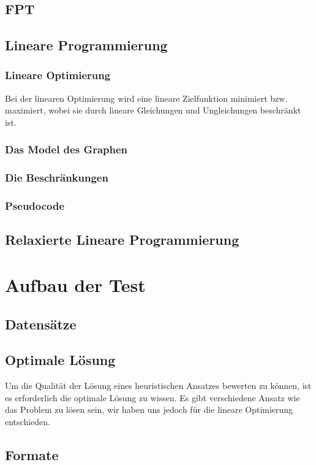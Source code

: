 \documentclass[12pt,a4paper,onecolumn,oneside,titlepage]{article}
\begin{document}
\subsection{FPT}
\subsection{Lineare Programmierung}
\subsubsection{Lineare Optimierung}
Bei der linearen Optimierung wird eine lineare Zielfunktion minimiert bzw. maximiert, wobei sie durch lineare Gleichungen und Ungleichungen beschränkt ist.
\subsubsection{Das Model des Graphen}

\subsubsection{Die Beschränkungen}
\subsubsection{Pseudocode}

\subsection{Relaxierte Lineare Programmierung}


\section{Aufbau der Test}
\subsection{Datensätze}
\subsection{Optimale Lösung}
Um die Qualität der Lösung eines heuristischen Ansatzes bewerten zu können, ist es erforderlich die optimale Lösung zu wissen. Es gibt verschiedene Ansatz wie das Problem zu lösen sein, wir haben uns jedoch für die lineare Optimierung entschieden.


\subsection{Formate}
\end{document}
